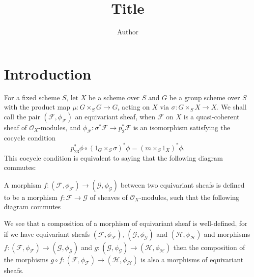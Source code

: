 \documentclass{article}
\title{Title}
\author{Author} \date{ }
\begin{document}
\maketitle

\tableofcontents

\newpage

\section{Introduction}
For a fixed scheme $S$, let $X$ be a scheme over $S$ and $G$ be a group scheme over $S$ with the product map 
$\mu:G \times _S G \rightarrow G$, acting on $X$ via $\sigma: G \times _S X \rightarrow X$. We shall call the pair
$(\mathcal F, \phi_\mathcal F)$ an equivariant sheaf, when $\mathcal F$ on $X$ is a quasi-coherent sheaf of 
$\mathcal O_X$-modules, and $\phi_{\mathcal F}: \sigma ^* \mathcal F \rightarrow p_2^* \mathcal F$ is an isomorphism 
satisfying the cocycle condition $$p_{23}^* \phi \circ (1_G \times _S \sigma)^*\phi = (m \times _S 1_X)^*\phi.$$ 
This cocycle condition is equivalent to saying that the following diagram commutes:


A morphism $f:(\mathcal F,\phi _\mathcal F) \rightarrow (\mathcal G, \phi_\mathcal G)$ between two equivariant sheafs
is defined to be a morphism $f:\mathcal F \rightarrow \mathcal G$ of sheaves of $\mathcal O_X$-modules,
such that the following diagram commutes
\begin{center}
\end{center}

We see that a composition of a morphism of equivariant sheaf is well-defined, for if we have equivariant sheafs
$(\mathcal F,\phi _\mathcal F)$, $(\mathcal G,\phi _\mathcal G)$ and $(\mathcal H,\phi _\mathcal H)$ and morphisms
$f:(\mathcal F,\phi _\mathcal F) \rightarrow (\mathcal G, \phi_\mathcal G)$ and
$g:(\mathcal G,\phi _\mathcal G) \rightarrow (\mathcal H, \phi_\mathcal H)$ then the composition of the morphisms 
$g \circ f : (\mathcal F,\phi _\mathcal F) \rightarrow (\mathcal H,\phi _\mathcal H)$ is also a morphisms of
equivariant sheafs.
\end{document}
